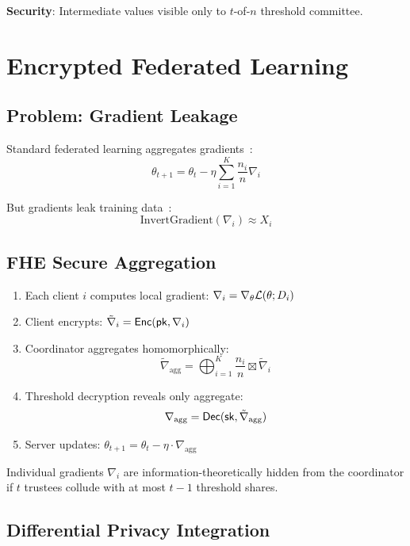 \documentclass{../shared/luxfhe}
\begin{document}
\textbf{Security}: Intermediate values visible only to $t$-of-$n$ threshold committee.

\section{Encrypted Federated Learning}

\subsection{Problem: Gradient Leakage}

Standard federated learning aggregates gradients~\cite{fedavg}:
\[
\theta_{t+1} = \theta_t - \eta \sum_{i=1}^{K} \frac{n_i}{n} \nabla_i
\]

But gradients leak training data~\cite{gradient-leakage}:
\[
\text{InvertGradient}(\nabla_i) \approx X_i
\]

\subsection{FHE Secure Aggregation}

\begin{protocol}
\begin{enumerate}
    \item Each client $i$ computes local gradient: $\nabla_i = \nabla_\theta \mathcal{L}(\theta; D_i)$
    \item Client encrypts: $\tilde{\nabla}_i = \mathsf{Enc}(\mathsf{pk}, \nabla_i)$
    \item Coordinator aggregates homomorphically:
    \[
    \tilde{\nabla}_{\text{agg}} = \bigoplus_{i=1}^{K} \frac{n_i}{n} \boxtimes \tilde{\nabla}_i
    \]
    \item Threshold decryption reveals only aggregate:
    \[
    \nabla_{\text{agg}} = \mathsf{Dec}(\mathsf{sk}, \tilde{\nabla}_{\text{agg}})
    \]
    \item Server updates: $\theta_{t+1} = \theta_t - \eta \cdot \nabla_{\text{agg}}$
\end{enumerate}
\end{protocol}

\begin{theorem}
Individual gradients $\nabla_i$ are information-theoretically hidden from the coordinator if $t$ trustees collude with at most $t-1$ threshold shares.
\end{theorem}

\subsection{Differential Privacy Integration}
\end{document}
